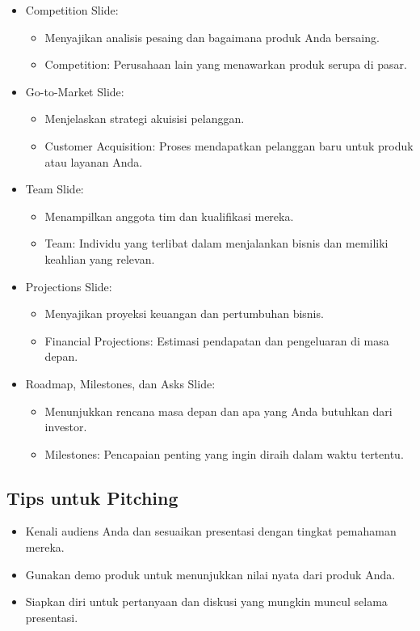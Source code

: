 \documentclass{article}
\begin{document}
\begin{itemize}
    \item Competition Slide:
          \begin{itemize}
              \item Menyajikan analisis pesaing dan bagaimana produk Anda bersaing.
              \item Competition: Perusahaan lain yang menawarkan produk serupa di pasar.
          \end{itemize}
    \item Go-to-Market Slide:
          \begin{itemize}
              \item Menjelaskan strategi akuisisi pelanggan.
              \item Customer Acquisition: Proses mendapatkan pelanggan baru untuk produk atau layanan Anda.
          \end{itemize}
    \item Team Slide:
          \begin{itemize}
              \item Menampilkan anggota tim dan kualifikasi mereka.
              \item Team: Individu yang terlibat dalam menjalankan bisnis dan memiliki keahlian yang relevan.
          \end{itemize}
    \item Projections Slide:
          \begin{itemize}
              \item Menyajikan proyeksi keuangan dan pertumbuhan bisnis.
              \item Financial Projections: Estimasi pendapatan dan pengeluaran di masa depan.
          \end{itemize}
    \item Roadmap, Milestones, dan Asks Slide:
          \begin{itemize}
              \item Menunjukkan rencana masa depan dan apa yang Anda butuhkan dari investor.
              \item Milestones: Pencapaian penting yang ingin diraih dalam waktu tertentu.
          \end{itemize}
\end{itemize}

\subsection{Tips untuk Pitching}
\begin{itemize}
    \item Kenali audiens Anda dan sesuaikan presentasi dengan tingkat pemahaman mereka.
    \item Gunakan demo produk untuk menunjukkan nilai nyata dari produk Anda.
    \item Siapkan diri untuk pertanyaan dan diskusi yang mungkin muncul selama presentasi.
\end{itemize}
\end{document}
